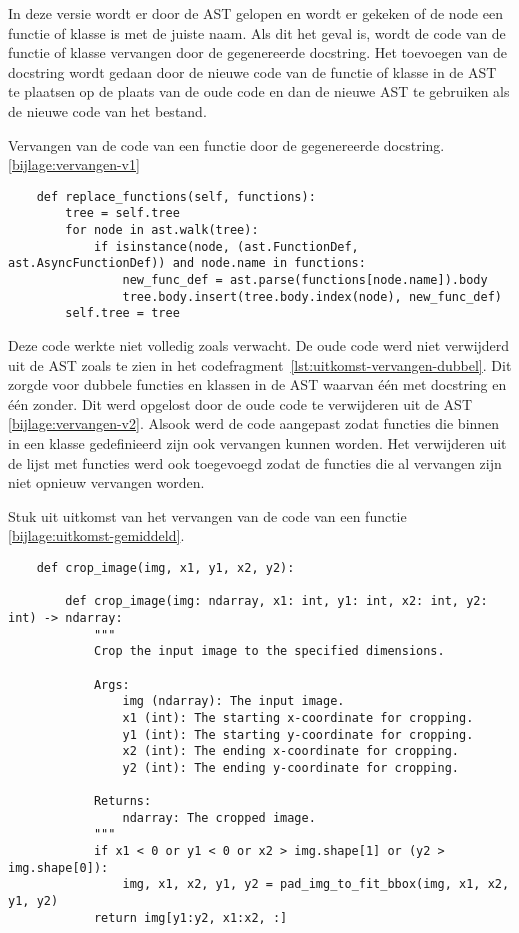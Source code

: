 In deze versie wordt er door de AST gelopen en wordt er gekeken of de node een functie of klasse is met de juiste naam. 
Als dit het geval is, wordt de code van de functie of klasse vervangen door de gegenereerde docstring.
Het toevoegen van de docstring wordt gedaan door de nieuwe code van de functie of klasse in de AST te plaatsen op de plaats van de oude code en dan de nieuwe AST te gebruiken als de nieuwe code van het bestand.

\begin{listing}
    \caption[Code voor het vervangen van een docstring]{Vervangen van de code van een functie door de gegenereerde docstring. \ref{bijlage:vervangen-v1}}
    \label{lst:vervangen-v1}
    \begin{verbatim}
    def replace_functions(self, functions):
        tree = self.tree
        for node in ast.walk(tree):
            if isinstance(node, (ast.FunctionDef, ast.AsyncFunctionDef)) and node.name in functions:
                new_func_def = ast.parse(functions[node.name]).body
                tree.body.insert(tree.body.index(node), new_func_def)        
        self.tree = tree

    \end{verbatim}
\end{listing}

Deze code werkte niet volledig zoals verwacht. De oude code werd niet verwijderd uit de AST zoals te zien in het codefragment~\ref{lst:uitkomst-vervangen-dubbel}. 
Dit zorgde voor dubbele functies en klassen in de AST waarvan één met docstring en één zonder. Dit werd opgelost door de oude code te verwijderen uit de AST \ref{bijlage:vervangen-v2}.
Alsook werd de code aangepast zodat functies die binnen in een klasse gedefinieerd zijn ook vervangen kunnen worden.
Het verwijderen uit de lijst met functies werd ook toegevoegd zodat de functies die al vervangen zijn niet opnieuw vervangen worden.

\begin{listing}
    \caption{Stuk uit uitkomst van het vervangen van de code van een functie \ref{bijlage:uitkomst-gemiddeld}.}
    \label{lst:uitkomst-vervangen-dubbel}
    \begin{verbatim}
    def crop_image(img, x1, y1, x2, y2):

        def crop_image(img: ndarray, x1: int, y1: int, x2: int, y2: int) -> ndarray:
            """
            Crop the input image to the specified dimensions.

            Args:
                img (ndarray): The input image.
                x1 (int): The starting x-coordinate for cropping.
                y1 (int): The starting y-coordinate for cropping.
                x2 (int): The ending x-coordinate for cropping.
                y2 (int): The ending y-coordinate for cropping.

            Returns:
                ndarray: The cropped image.
            """
            if x1 < 0 or y1 < 0 or x2 > img.shape[1] or (y2 > img.shape[0]):
                img, x1, x2, y1, y2 = pad_img_to_fit_bbox(img, x1, x2, y1, y2)
            return img[y1:y2, x1:x2, :]
    \end{verbatim}
\end{listing}


